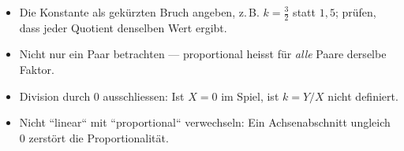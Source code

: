 \begin{achtung}
\begin{itemize}
  \item Die Konstante als gekürzten Bruch angeben, z.\,B. $k=\tfrac32$
        statt $1{,}5$; prüfen, dass jeder Quotient denselben Wert ergibt.
  \item Nicht nur ein Paar betrachten --- proportional heisst für
        \emph{alle} Paare derselbe Faktor.
  \item Division durch $0$ ausschliessen: Ist $X=0$ im Spiel, ist
        $k=Y/X$ nicht definiert.
  \item Nicht ``linear`` mit ``proportional`` verwechseln: Ein
        Achsenabschnitt ungleich $0$ zerstört die Proportionalität.
\end{itemize}
\end{achtung}
